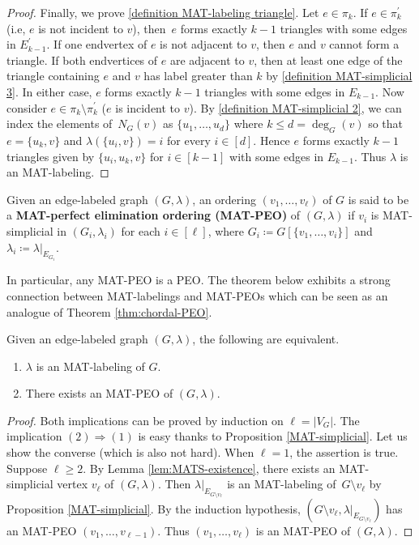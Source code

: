 \begin{proof}
Finally, we prove \ref{definition MAT-labeling triangle}. 
Let $ e \in \pi_{k} $.
If $ e \in \pi_{k}^{\prime} $ (i.e, $ e $ is not incident to $ v $), then~$ e $ forms exactly $ k-1 $ triangles with some edges in $ E_{k-1}^{\prime} $. 
If one endvertex of $ e $ is not adjacent to $ v $, then $ e $ and $v$ cannot form a triangle. 
If both endvertices of $ e $ are adjacent to $ v $, then at least one edge of the triangle containing $ e $ and $ v $ has label greater than $ k $ by \ref{definition MAT-simplicial 3}. 
In either case, $ e $ forms exactly $ k-1 $ triangles with some edges in $ E_{k-1} $. 
Now consider  $ e \in \pi_{k} \setminus \pi_{k}^{\prime} $ (\ie  $ e $ is incident to $ v $). 
By  \ref{definition MAT-simplicial 2}, we can index the elements of~$ N_{G}(v)$  as $\{u_{1}, \dots, u_{d}\} $  where $k\le d=\deg_G(v)$ so that $ e = \{u_{k}, v\} $ and $ \lambda(\{u_{i}, v\}) = i $ for every $ i \in [d] $. 
Hence $ e $ forms exactly $ k-1 $ triangles given by $ \{u_{i}, u_{k}, v\} $ for $ i \in [k-1] $ with some edges in $ E_{k-1} $.  
Thus $ \lambda $ is an MAT-labeling.  
\end{proof}

\begin{definition}
Given an edge-labeled graph $ (G,\lambda) $, an ordering $ (v_{1}, \dots, v_{\ell}) $ of $ G $ is said to be a \textbf{MAT-perfect elimination ordering (MAT-PEO)} of $ (G,\lambda) $ if $ v_{i} $ is MAT-simplicial in $ (G_{i}, \lambda_{i}) $ for each $ i \in [\ell] $, where $ G_{i} \coloneqq G[\{v_{1}, \dots, v_{i}\}] $ and $ \lambda_{i} \coloneqq \lambda|_{E_{G_{i}}} $. 
\end{definition}

In particular, any MAT-PEO is a PEO.
The theorem below exhibits a strong connection between MAT-labelings and MAT-PEOs which can be seen as an analogue of Theorem \ref{thm:chordal-PEO}.
\begin{theorem}
\label{MAT-labeling ordering}
Given an edge-labeled graph $ (G, \lambda) $, the following are equivalent. 
\begin{enumerate}[(1)]
\item $ \lambda $ is an MAT-labeling of $ G $. 
\item There exists an MAT-PEO of $ (G, \lambda) $. 
\end{enumerate}
\end{theorem}
\begin{proof}
Both implications can be proved by induction on $ \ell = |V_{G}| $.
The implication $ (2) \Rightarrow (1) $ is easy thanks to Proposition \ref{MAT-simplicial}. 
Let us show the converse (which is also not hard). 
When $ \ell = 1 $, the assertion is true.
Suppose $ \ell \geq 2 $. 
By Lemma \ref{lem:MATS-existence}, there exists an MAT-simplicial vertex $ v_{\ell} $ of $ (G, \lambda) $. 
Then $ \lambda|_{E_{G\setminus v_{\ell}}} $ is an MAT-labeling of~$ G\setminus v_{\ell} $ by Proposition \ref{MAT-simplicial}. 
By the induction hypothesis, $ (G\setminus v_{\ell}, \lambda|_{E_{G\setminus v_{\ell}}}) $ has an MAT-PEO $ (v_{1}, \dots, v_{\ell -1}) $. 
Thus $ (v_{1}, \dots, v_{\ell}) $ is an MAT-PEO of $ (G,\lambda) $. 
\end{proof}

